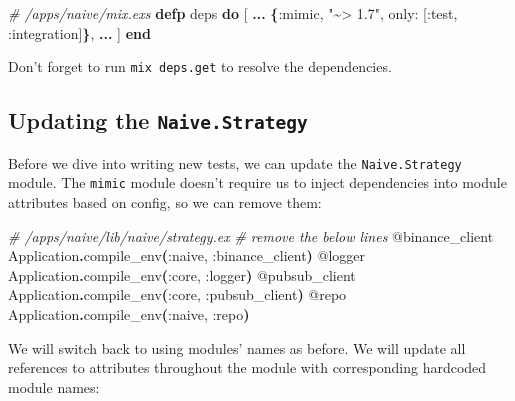 \documentclass[
  oneside]{book}
\newenvironment{Shaded}{\begin{snugshade}}{\end{snugshade}}
\newcommand{\CommentTok}[1]{\textcolor[rgb]{0.56,0.35,0.01}{\textit{#1}}}
\newcommand{\ConstantTok}[1]{\textcolor[rgb]{0.56,0.35,0.01}{#1}}
\newcommand{\FunctionTok}[1]{\textcolor[rgb]{0.13,0.29,0.53}{\textbf{#1}}}
\newcommand{\KeywordTok}[1]{\textcolor[rgb]{0.13,0.29,0.53}{\textbf{#1}}}
\newcommand{\NormalTok}[1]{#1}
\newcommand{\OperatorTok}[1]{\textcolor[rgb]{0.81,0.36,0.00}{\textbf{#1}}}
\newcommand{\OtherTok}[1]{\textcolor[rgb]{0.56,0.35,0.01}{#1}}
\newcommand{\StringTok}[1]{\textcolor[rgb]{0.31,0.60,0.02}{#1}}
\newcommand{\VariableTok}[1]{\textcolor[rgb]{0.00,0.00,0.00}{#1}}
\begin{document}
\begin{Shaded}
\begin{Highlighting}[]
  \CommentTok{\# /apps/naive/mix.exs}
  \KeywordTok{defp}\NormalTok{ deps }\KeywordTok{do}
    \OtherTok{[}
      \OperatorTok{...}
      \FunctionTok{\{}\VariableTok{:mimic}\NormalTok{, }\StringTok{"\textasciitilde{}\textgreater{} 1.7"}\NormalTok{, }\VariableTok{only:} \OtherTok{[}\VariableTok{:test}\NormalTok{, }\VariableTok{:integration}\OtherTok{]}\FunctionTok{\}}\NormalTok{,}
      \OperatorTok{...}
    \OtherTok{]}
  \KeywordTok{end}
\end{Highlighting}
\end{Shaded}

Don't forget to run \texttt{mix\ deps.get} to resolve the dependencies.

\subsection{\texorpdfstring{Updating the \texttt{Naive.Strategy}}{Updating the Naive.Strategy}}\label{updating-the-naive.strategy-1}

Before we dive into writing new tests, we can update the \texttt{Naive.Strategy} module. The \texttt{mimic} module doesn't require us to inject dependencies into module attributes based on config, so we can remove them:

\begin{Shaded}
\begin{Highlighting}[]
\CommentTok{\# /apps/naive/lib/naive/strategy.ex}
  \CommentTok{\# remove the below lines}
  \OtherTok{@binance\_client} \ConstantTok{Application}\OperatorTok{.}\NormalTok{compile\_env}\FunctionTok{(}\VariableTok{:naive}\NormalTok{, }\VariableTok{:binance\_client}\FunctionTok{)}
  \OtherTok{@logger} \ConstantTok{Application}\OperatorTok{.}\NormalTok{compile\_env}\FunctionTok{(}\VariableTok{:core}\NormalTok{, }\VariableTok{:logger}\FunctionTok{)}
  \OtherTok{@pubsub\_client} \ConstantTok{Application}\OperatorTok{.}\NormalTok{compile\_env}\FunctionTok{(}\VariableTok{:core}\NormalTok{, }\VariableTok{:pubsub\_client}\FunctionTok{)}
  \OtherTok{@repo} \ConstantTok{Application}\OperatorTok{.}\NormalTok{compile\_env}\FunctionTok{(}\VariableTok{:naive}\NormalTok{, }\VariableTok{:repo}\FunctionTok{)}
\end{Highlighting}
\end{Shaded}

We will switch back to using modules' names as before. We will update all references to attributes throughout the module with corresponding hardcoded module names:
\end{document}
